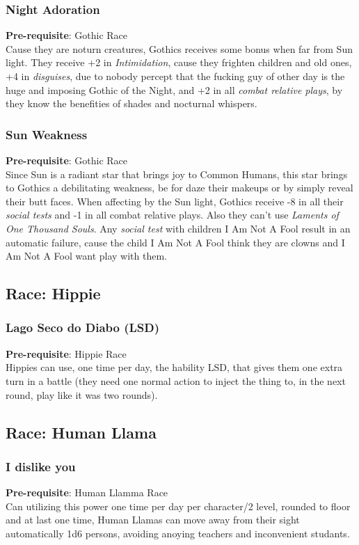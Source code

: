 \documentclass[ letterpaper,12pt]{article}
\begin{document}
\subsubsection{Night Adoration}
{\bf Pre-requisite}: Gothic Race\\
Cause they are noturn creatures, Gothics receives some bonus when far from Sun light.  They receive +2 in {\it Intimidation}, cause they frighten children and old ones, +4 in {\it disguises}, due to nobody percept that the fucking guy of other day is the huge and imposing Gothic of the Night, and +2 in all {\it combat relative plays}, by they know the benefities of shades and nocturnal whispers.\\

\subsubsection{Sun Weakness}
 {\bf Pre-requisite}: Gothic Race\\
 Since Sun is a radiant star that brings joy to Common Humans, this star brings to Gothics a debilitating weakness, be for daze their makeups or by simply reveal their butt faces. When affecting by the Sun light, Gothics receive -8 in all their {\it social tests} and -1 in all {combat relative plays}. Also they can't use {\it Laments of One Thousand Souls}. Any {\it social test} with children I Am Not A Fool result in an automatic failure, cause the child I Am Not A Fool think they are clowns and I Am Not A Fool want play with them.

\subsection{Race: Hippie}

\subsubsection{Lago Seco do Diabo (LSD)}
{\bf Pre-requisite}: Hippie Race\\
Hippies can use, one time per day, the hability LSD, that gives them one extra turn in a battle (they need one normal action to inject the thing to, in the next round, play like it was two rounds).

\subsection{Race: Human Llama}

\subsubsection{I dislike you}
 {\bf Pre-requisite}: Human Llamma Race\\
Can utilizing this power one time per day per character/2 level, rounded to floor and at last one time, Human Llamas can move away from their sight automatically 1d6 persons, avoiding anoying teachers and inconvenient studants.
\end{document}
